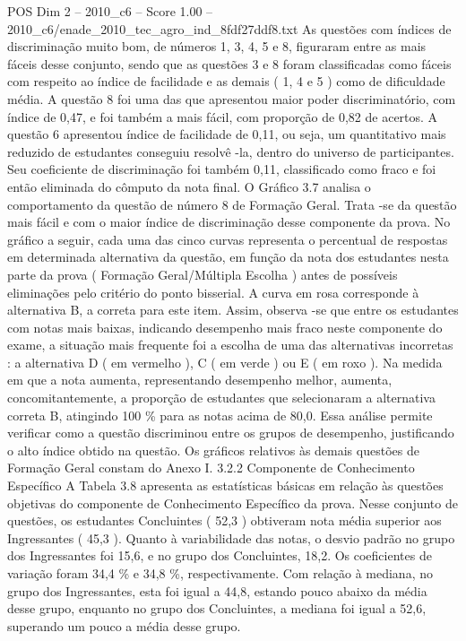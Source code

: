 \begin{textsample}{POS Dim 2 – 2010\_c6 – Score 1.00 – 2010\_c6/enade\_2010\_tec\_agro\_ind\_8fdf27ddf8.txt}
As questões com índices de discriminação muito bom, de números 1, 3, 4, 5 e 8, figuraram entre as mais fáceis desse conjunto, sendo que as questões 3 e 8 foram classificadas como fáceis com respeito ao índice de facilidade e as demais ( 1, 4 e 5 ) como de dificuldade média.
A questão 8 foi uma das que apresentou maior poder discriminatório, com índice de 0,47, e foi também a mais fácil, com proporção de 0,82 de acertos.
A questão 6 apresentou índice de facilidade de 0,11, ou seja, um quantitativo mais reduzido de estudantes conseguiu resolvê -la, dentro do universo de participantes.
Seu coeficiente de discriminação foi também 0,11, classificado como fraco e foi então eliminada do cômputo da nota final.
O Gráfico 3.7 analisa o comportamento da questão de número 8 de Formação Geral.
Trata -se da questão mais fácil e com o maior índice de discriminação desse componente da prova.
No gráfico a seguir, cada uma das cinco curvas representa o percentual de respostas em determinada alternativa da questão, em função da nota dos estudantes nesta parte da prova ( Formação Geral/Múltipla Escolha ) antes de possíveis eliminações pelo critério do ponto bisserial.
A curva em rosa corresponde à alternativa B, a correta para este item.
Assim, observa -se que entre os estudantes com notas mais baixas, indicando desempenho mais fraco neste componente do exame, a situação mais frequente foi a escolha de uma das alternativas incorretas : a alternativa D ( em vermelho ), C ( em verde ) ou E ( em roxo ).
Na medida em que a nota aumenta, representando desempenho melhor, aumenta, concomitantemente, a proporção de estudantes que selecionaram a alternativa correta B, atingindo 100 \% para as notas acima de 80,0.
Essa análise permite verificar como a questão discriminou entre os grupos de desempenho, justificando o alto índice obtido na questão.
Os gráficos relativos às demais questões de Formação Geral constam do Anexo I. 3.2.2 Componente de Conhecimento Específico A Tabela 3.8 apresenta as estatísticas básicas em relação às questões objetivas do componente de Conhecimento Específico da prova.
Nesse conjunto de questões, os estudantes Concluintes ( 52,3 ) obtiveram nota média superior aos Ingressantes ( 45,3 ).
Quanto à variabilidade das notas, o desvio padrão no grupo dos Ingressantes foi 15,6, e no grupo dos Concluintes, 18,2.
Os coeficientes de variação foram 34,4 \% e 34,8 \%, respectivamente.
Com relação à mediana, no grupo dos Ingressantes, esta foi igual a 44,8, estando pouco abaixo da média desse grupo, enquanto no grupo dos Concluintes, a mediana foi igual a 52,6, superando um pouco a média desse grupo.

\end{textsample}

